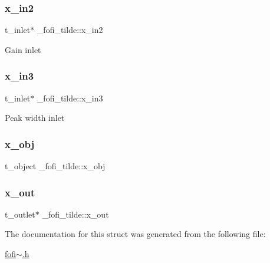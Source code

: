 \subsubsection{\texorpdfstring{x\_in2}{x\_in2}}
{\footnotesize\ttfamily t\+\_\+inlet$\ast$ \+\_\+fofi\+\_\+tilde\+::x\+\_\+in2}

Gain inlet \mbox{\label{struct__fofi__tilde_a243e1b723c18fb1bb57ecfbc1c5b84f6}} 
\subsubsection{\texorpdfstring{x\_in3}{x\_in3}}
{\footnotesize\ttfamily t\+\_\+inlet$\ast$ \+\_\+fofi\+\_\+tilde\+::x\+\_\+in3}

Peak width inlet \mbox{\label{struct__fofi__tilde_a1f651402d2c0639cd164d6b3d984a5c1}} 
\subsubsection{\texorpdfstring{x\_obj}{x\_obj}}
{\footnotesize\ttfamily t\+\_\+object \+\_\+fofi\+\_\+tilde\+::x\+\_\+obj}

\mbox{\label{struct__fofi__tilde_a5cdfe16a03a81e1ffb3bb60ab0e92eca}} 
\subsubsection{\texorpdfstring{x\_out}{x\_out}}
{\footnotesize\ttfamily t\+\_\+outlet$\ast$ \+\_\+fofi\+\_\+tilde\+::x\+\_\+out}



The documentation for this struct was generated from the following file\+:\begin{DoxyCompactItemize}
\item 
\mbox{\hyperlink{fofi~_8h}{fofi$\sim$.\+h}}\end{DoxyCompactItemize}
